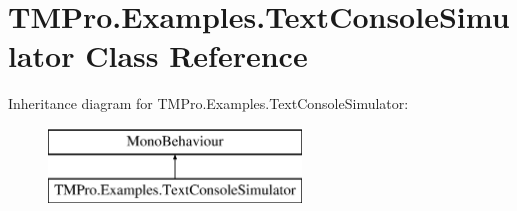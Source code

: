 \hypertarget{class_t_m_pro_1_1_examples_1_1_text_console_simulator}{}\section{T\+M\+Pro.\+Examples.\+Text\+Console\+Simulator Class Reference}
\label{class_t_m_pro_1_1_examples_1_1_text_console_simulator}
Inheritance diagram for T\+M\+Pro.\+Examples.\+Text\+Console\+Simulator\+:\begin{figure}[H]
\begin{center}
\leavevmode
\includegraphics[height=2.000000cm]{class_t_m_pro_1_1_examples_1_1_text_console_simulator}
\end{center}
\end{figure}
